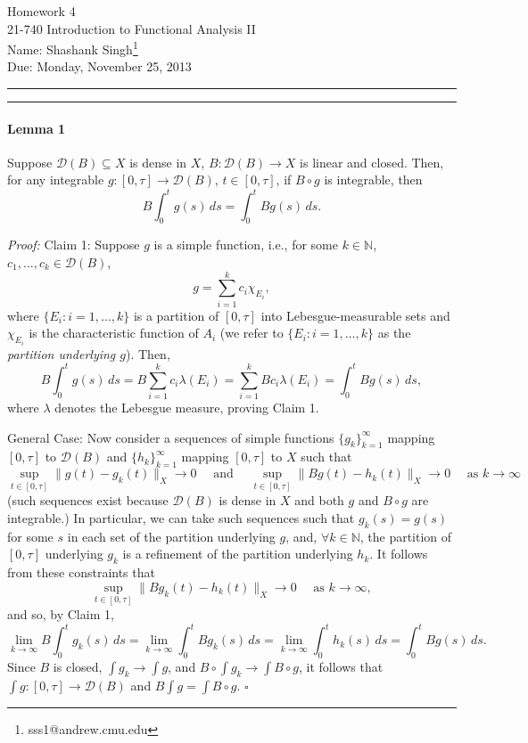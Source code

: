 \documentclass[11pt]{article}
\makeatletter
\newcounter{questionCounter}
\newcounter{partCounter}[questionCounter]
\newenvironment{question}[2][\arabic{questionCounter}]{%
    \setcounter{partCounter}{0}%
    \vspace{.25in} \hrule \vspace{0.5em}%
        \noindent{\bf #2}%
    \vspace{0.8em} \hrule \vspace{.10in}%
    \addtocounter{questionCounter}{1}%
}{}
\newcommand{\myname}{Shashank Singh\footnote{sss1@andrew.cmu.edu}}
\newcommand{\myclass}{21-740 Introduction to Functional Analysis II}
\newcommand{\myhwnum}{4}
\newcommand{\duedate}{Monday, November 25, 2013}
\newcommand{\N}{\mathbb{N}}             %
\newcommand{\D}{\mathcal{D}}            %
\makeatother
\begin{document}
\thispagestyle{plain}

{\Large Homework \myhwnum} \\
\myclass \\
Name: \myname \\
Due: \duedate

\begin{question}{Problem 1}
\vspace{-6mm}
\paragraph{Lemma 1} Suppose $\D(B) \subseteq X$ is dense in $X$,
$B : \D(B) \to X$ is linear and closed. Then, for any integrable
$g : [0,\tau] \to \D(B)$, $t \in [0,\tau]$, if $B \circ g$ is integrable, then
\[B\int_0^t g(s) \, ds = \int_0^t Bg(s) \, ds.\]

\emph{Proof:} Claim 1: Suppose $g$ is a simple function, i.e., for some
$k \in \N$, $c_1,\dots,c_k \in \D(B)$,
\[g = \sum_{i = 1}^k c_i \chi_{E_i},\]
where $\{E_i : i = 1,\dots,k\}$ is a partition of $[0,\tau]$ into
Lebesgue-measurable sets and $\chi_{E_i}$ is the characteristic function of
$A_i$ (we refer to $\{E_i : i = 1,\dots,k\}$ as the \emph{partition underlying
$g$}). Then,
\[B\int_0^t g(s) \, ds
    = B \sum_{i = 1}^k c_i \lambda(E_i)
    = \sum_{i = 1}^k B c_i \lambda(E_i)
    = \int_0^t B g(s) \, ds,
\]
where $\lambda$ denotes the Lebesgue measure, proving Claim 1.

General Case: Now consider a sequences of
simple functions $\{g_k\}_{k = 1}^\infty$ mapping $[0,\tau]$ to $\D(B)$ and
$\{h_k\}_{k = 1}^\infty$ mapping $[0,\tau]$ to $X$ such that
\[\sup_{t \in [0,\tau]} \|g(t) - g_k(t)\|_X \to 0
\quad \mbox{ and } \quad
\sup_{t \in [0,\tau]} \|Bg(t) - h_k(t)\|_X \to 0
\quad \mbox{ as } k \to \infty
\]
(such sequences exist because $\D(B)$ is dense in $X$ and both $g$ and
$B \circ g$ are integrable.) In particular, we can take such sequences such
that $g_k(s) = g(s)$ for some $s$ in each set of the partition underlying $g$,
and, $\forall k \in \N$, the partition of $[0,\tau]$ underlying $g_k$ is a
refinement of the partition underlying $h_k$. It follows from these constraints
that
\[\sup_{t \in [0,\tau]} \|Bg_k(t) - h_k(t)\|_X \to 0
    \quad \mbox{ as } k \to \infty,
\]
and so, by Claim 1,
\[\lim_{k \to \infty} B \int_0^t g_k(s) \, ds
    = \lim_{k \to \infty} \int_0^t Bg_k(s) \, ds
    = \lim_{k \to \infty} \int_0^t h_k(s) \, ds
    = \int_0^t Bg(s) \, ds
.\]
Since $B$ is closed, $\int g_k \to \int g$, and
$B \circ \int g_k \to \int B \circ g$, it follows that
$\int g : [0,\tau] \to \D(B)$ and $B \int g = \int B \circ g$. $\square$


\end{question}
\end{document}
